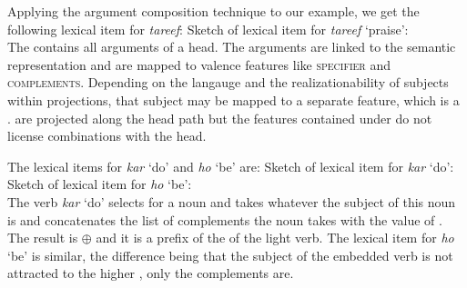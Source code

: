 Applying the argument composition technique to our example, we get the following lexical item for
\emph{tareef}:
\ea
Sketch of lexical item for \emph{tareef} `praise':\\
\z
The \argstl contains all arguments of a head. The arguments are linked to the semantic representation
and are mapped to valence features like \textsc{specifier} and \textsc{complements}. Depending on
the langauge and the realizationability of subjects within projections, that subject may be mapped to
a separate feature, which is a \headf. \headfs are projected along the head path but the features
contained under \head do not license combinations with the head.

The lexical items for \emph{kar} `do' and  \emph{ho} `be' are:
\eal
\ex Sketch of lexical item for \emph{kar} `do':\\
\ex Sketch of lexical item for \emph{ho} `be':\\
\zl
The verb \emph{kar} `do' selects for a noun and takes whatever the subject of this noun is  and 
concatenates the list of complements the noun takes  with the value of \subj. The result is  $\oplus$
 and it is a prefix of the \argstl of the light verb. 
The lexical item for \emph{ho} `be' is similar, the difference being that the subject of the
embedded verb is not attracted to the higher \argstl, only the complements  are.


